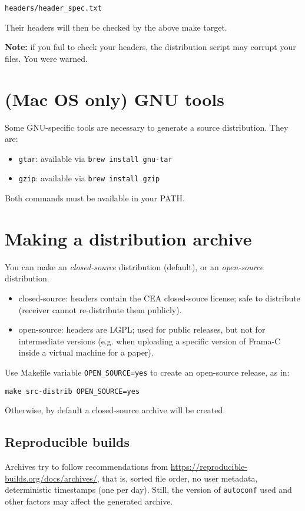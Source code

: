\verb+headers/header_spec.txt+

Their headers will then be checked by the above make target.

\textbf{Note:} if you fail to check your headers, the distribution script may
corrupt your files. You were warned.

\section{(Mac OS only) GNU tools}

Some GNU-specific tools are necessary to generate a source distribution. They
are:

\begin{itemize}
\item \texttt{gtar}: available via \texttt{brew install gnu-tar}
\item \texttt{gzip}: available via \texttt{brew install gzip}
\end{itemize}

Both commands must be available in your PATH.

\section{Making a distribution archive}

You can make an {\em closed-source} distribution (default),
or an {\em open-source} distribution.

\begin{itemize}
\item closed-source: headers contain the CEA closed-souce license; safe to
  distribute (receiver cannot re-distribute them publicly).
\item open-source: headers are LGPL; used for public releases, but not for
  intermediate versions (e.g. when uploading a specific version of Frama-C
  inside a virtual machine for a paper).
\end{itemize}

Use Makefile variable \verb+OPEN_SOURCE=yes+ to create an open-source release,
as in:

\verb+make src-distrib OPEN_SOURCE=yes+

Otherwise, by default a closed-source archive will be created.

\subsection{Reproducible builds}

Archives try to follow recommendations from \url{https://reproducible-builds.org/docs/archives/},
that is, sorted file order, no user metadata, deterministic timestamps
(one per day). Still, the version of \verb+autoconf+ used and other factors
may affect the generated archive.
